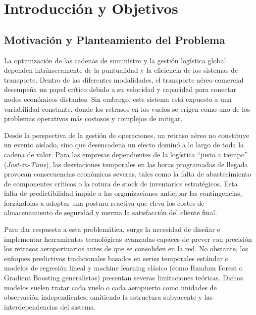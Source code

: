 \documentclass[12pt,oneside,a4paper]{report}
\renewcommand{\_}{\textunderscore\allowbreak}
\begin{document}
\cleardoublepage
\listoftables
\newpage

\cleardoublepage
{}
\setcounter{page}{1}

\chapter{Introducción y Objetivos}
\label{cap:introduccion}

\section{Motivación y Planteamiento del Problema}
\label{sec:motivacion}

La optimización de las cadenas de suministro y la gestión logística global dependen intrínsecamente de la puntualidad y la eficiencia de los sistemas de transporte. Dentro de las diferentes modalidades, el transporte aéreo comercial desempeña un papel crítico debido a su velocidad y capacidad para conectar nodos económicos distantes. Sin embargo, este sistema está expuesto a una variabilidad constante, donde los retrasos en los vuelos se erigen como uno de los problemas operativos más costosos y complejos de mitigar.

Desde la perspectiva de la gestión de operaciones, un retraso aéreo no constituye un evento aislado, sino que desencadena un efecto dominó a lo largo de toda la cadena de valor. Para las empresas dependientes de la logística ``justo a tiempo'' (\textit{Just-in-Time}), las desviaciones temporales en las horas programadas de llegada provocan consecuencias económicas severas, tales como la falta de abastecimiento de componentes críticos o la rotura de stock de inventarios estratégicos. Esta falta de predictibilidad impide a las organizaciones anticipar las contingencias, forzándolas a adoptar una postura reactiva que eleva los costes de almacenamiento de seguridad y merma la satisfacción del cliente final.

Para dar respuesta a esta problemática, surge la necesidad de diseñar e implementar herramientas tecnológicas avanzadas capaces de prever con precisión los retrasos aeroportuarios antes de que se consoliden en la red. No obstante, los enfoques predictivos tradicionales basados en series temporales estándar o modelos de regresión lineal y machine learning clásico (como Random Forest o Gradient Boosting generalistas) presentan severas limitaciones teóricas. Dichos modelos suelen tratar cada vuelo o cada aeropuerto como unidades de observación independientes, omitiendo la estructura subyacente y las interdependencias del sistema.
\end{document}
